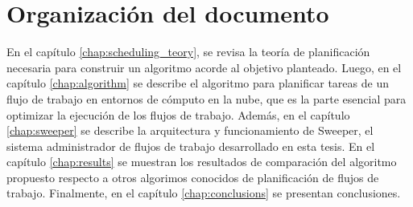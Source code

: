 \section{Organización del documento}

En el capítulo \ref{chap:scheduling_teory}, se revisa la teoría de planificación necesaria para construir un algoritmo acorde al objetivo planteado. Luego, en el capítulo \ref{chap:algorithm} se describe el algoritmo para planificar tareas de un flujo de trabajo en entornos de cómputo en la nube, que es la parte esencial para optimizar la ejecución de los flujos de trabajo. Además, en el capítulo \ref{chap:sweeper} se describe la arquitectura y funcionamiento de Sweeper, el sistema administrador de flujos de trabajo desarrollado en esta tesis. En el cap\'itulo \ref{chap:results} se muestran los resultados de comparaci\'on del algoritmo propuesto respecto a otros algorimos conocidos de planificaci\'on de flujos de trabajo. Finalmente, en el capítulo \ref{chap:conclusions} se presentan conclusiones.
